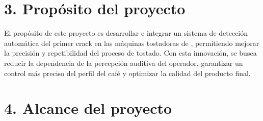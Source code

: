 \documentclass[
11pt, %
]{charter}
\begin{document}
\section{3. Propósito del proyecto}
\label{sec:proposito}

El propósito de este proyecto es desarrollar e integrar un sistema de detección automática del primer crack en las máquinas tostadoras de \empclientename, permitiendo mejorar la precisión y repetibilidad del proceso de tostado. Con esta innovación, se busca reducir la dependencia de la percepción auditiva del operador, garantizar un control más preciso del perfil del café y optimizar la calidad del producto final.

\section{4. Alcance del proyecto}
\label{sec:alcance}
\end{document}
